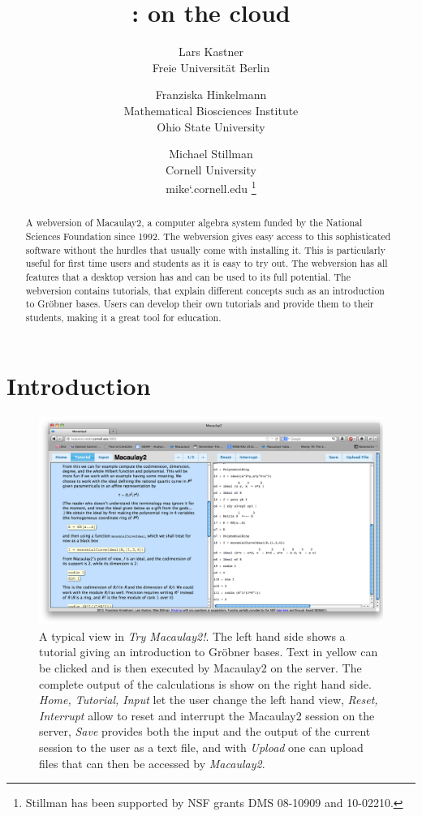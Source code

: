 \documentclass[]{article}
\title{\tryM2: \M2 on the cloud}
\author{Lars Kastner\\ Freie Universit\"at Berlin \and 
Franziska Hinkelmann\\Mathematical Biosciences Institute\\ Ohio State University \and 
Michael Stillman\\Cornell University \\{\small mike\char`\@math.cornell.edu} \thanks{Stillman has been supported by NSF grants DMS 08-10909 and 10-02210.} }
\date{}
\def\tryM2{{\it Try Macaulay2!}}
\def\M2{{\it Macaulay2}}
\begin{document}
\ifpdf
{}
\else
{}
\fi



\maketitle



\begin{abstract}

    A webversion of Macaulay2, a computer algebra system funded by the
    National Sciences Foundation since 1992. The webversion gives easy
    access to this sophisticated software without the hurdles that
    usually come with installing it. This is particularly useful for
    first time users and students as it is easy to try out. The
    webversion has all features that a desktop version has and can be
    used to its full potential. The webversion contains tutorials,
    that explain different concepts such as an introduction to
    Gr\"obner bases. Users can develop their own tutorials and provide
    them to their students, making it a great tool for education.

\end{abstract}


\section{Introduction}
\begin{figure}[htb]
    \includegraphics[width=.95\textwidth]{homeWebsite.jpg}
    \caption{A typical view in \tryM2. The left hand
      side shows a tutorial giving an introduction to Gr\"obner
      bases. Text in yellow can be clicked and is then executed by
      Macaulay2 on the server. The complete output of the calculations
      is show on the right hand side. {\it Home, Tutorial, Input} let
      the user change the left hand view, {\it Reset, Interrupt} allow
      to reset and interrupt the Macaulay2 session on the server, {\it
        Save} provides both the input and the output of the current
      session to the user as a text file, and with {\it Upload} one
      can upload files that can then be accessed by \M2.}
    \label{fig:home}
\end{figure}
\end{document}
